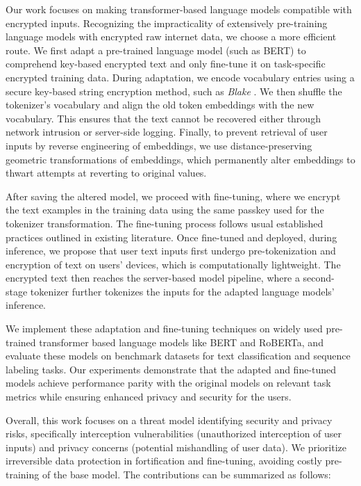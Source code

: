 \documentclass[letterpaper]{article} %
\begin{document}
Our work focuses on making transformer-based language models compatible with encrypted inputs. Recognizing the impracticality of extensively pre-training language models with encrypted raw internet data, we choose a more efficient route. We first adapt a pre-trained language model (such as BERT) to comprehend key-based encrypted text and only fine-tune it on task-specific encrypted training data. During adaptation, we encode vocabulary entries using a secure key-based string encryption method, such as \emph{Blake} \cite{blake2}. We then shuffle the tokenizer's vocabulary and align the old token embeddings with the new vocabulary. This ensures that the text cannot be recovered either through network intrusion or server-side logging. Finally, to prevent retrieval of user inputs by reverse engineering of embeddings, we use distance-preserving geometric transformations of embeddings, which permanently alter embeddings to thwart attempts at reverting to original values.

After saving the altered model, we proceed with fine-tuning, where we encrypt the text examples in the training data using the same passkey used for the tokenizer transformation. The fine-tuning process follows usual established practices outlined in existing literature. Once fine-tuned and deployed, during inference, we propose that user text inputs first undergo pre-tokenization and encryption of text on users' devices, which is computationally lightweight. The encrypted text then reaches the server-based model pipeline, where a second-stage tokenizer further tokenizes the inputs for the adapted language models' inference.

We implement these adaptation and fine-tuning techniques on widely used pre-trained transformer based language models like BERT and RoBERTa, and evaluate these models on benchmark datasets for text classification and sequence labeling tasks. Our experiments demonstrate that the adapted and fine-tuned models achieve performance parity with the original models on relevant task metrics while ensuring enhanced privacy and security for the users.

Overall, this work focuses on a threat model identifying security and privacy risks, specifically interception vulnerabilities (unauthorized interception of user inputs) and privacy concerns (potential mishandling of user data). We prioritize irreversible data protection in fortification and fine-tuning, avoiding costly pre-training of the base model. The contributions can be summarized as follows: 
\end{document}

